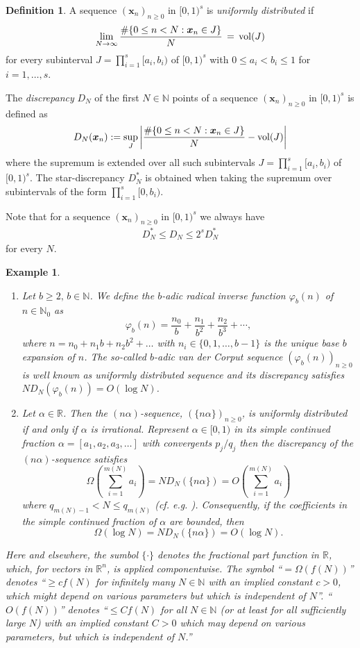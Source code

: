\documentclass{article}
\newcommand{\bsx}{\boldsymbol{x}}%
\newcommand{\NN}{\mathbb N}
\newcommand{\RR}{\mathbb R}
\newcommand{\vol}{{\rm vol}}
\renewcommand{\(}{\left (}
\renewcommand{\)}{\right )}
\newtheorem{example}[theorem]{Example}
\theoremstyle{definition}
\newtheorem{definition}[theorem]{Definition}
\numberwithin{equation}{section}
\begin{document}
\begin{definition}
	A sequence $(\bsx_n)_{n\geq 0}$ in $[0,1)^s$ is \emph{uniformly distributed} if 
	$$\lim_{N\to\infty}\frac{\#\{0\leq n<N: \bsx_n\in J\}}{N}\,=\,\vol(J)$$
	for every subinterval $J=\prod_{i=1}^s[a_i,b_i)$ of $[0,1)^s$ with $0\leq a_i<b_i\leq 1$ for $i=1,\ldots,s$. 

	The \emph{discrepancy} $D_N$ of the first $N\in\NN$ points of a sequence $(\bsx_n)_{n\geq 0}$ in $[0,1)^s$ is defined as  
	$$D_N(\bsx_n):=\sup_{J} \left|\frac{\#\{0\leq n<N: \bsx_n \in J\}}{N}-\vol(J)\right|$$
	where the supremum is extended over all such subintervals $J=\prod_{i=1}^s[a_i,b_i)$ of $[0,1)^s$. 
	The star-discrepancy $D^*_N$ is obtained when taking the supremum over subintervals of the form $\prod_{i=1}^s[0,b_i)$. 
\end{definition}
Note that for a sequence $(\bsx_n)_{n\geq 0}$ in $[0,1)^s$ we always have 
\begin{align}\label{eq:starvsnonstar}
D^*_N\leq D_N\leq 2^s D^*_N
\end{align}
 for every $N$. 
\begin{example}\label{ex:1}{\rm
	\begin{enumerate}
		\item Let $b\geq 2,\,b\in\NN$. We define the $b$-adic radical inverse function $\varphi_b(n)$ of $n\in\NN_0$ as $$\varphi_b(n)=\frac{n_0}{b}+\frac{n_1}{b^2}+\frac{n_2}{b^3}+\cdots,$$
		where $n=n_0+n_1b+n_2b^2+\ldots$ with $n_i\in\{0,1,\ldots,b-1\}$ is the unique base $b$ expansion of $n$. 
		The so-called $b$-adic van der Corput sequence $(\varphi_b(n))_{n\geq 0}$ is well known as {uniformly distributed} sequence and its {discrepancy} satisfies $ND_N(\varphi_b(n))=O(\log N)$. 
		\item Let $\alpha\in\RR$. Then the \emph{$(n\alpha)$-sequence}, $(\{n\alpha\})_{n\geq 0}$, is {uniformly distributed} if and only if $\alpha$ is irrational. 
		Represent $\alpha\in[0,1)$ in its simple continued fraction $\alpha=[a_1,a_2,a_3,\ldots]$ with convergents $p_j/q_j$ then the discrepancy of the \emph{$(n\alpha)$-sequence} satisfies 
		$$\Omega\left(\sum_{i=1}^{m(N)}a_i\right) =ND_N(\{n\alpha \})=O\left(\sum_{i=1}^{m(N)}a_i\right)$$ 
		where $q_{m(N)-1}<N\leq q_{m(N)}$ (cf. e.g. \cite[Corollary~1.64]{DT}). Consequently, if the coefficients in the simple continued fraction of $\alpha$ are bounded, then 
		\begin{equation}\label{eq:disc_nalpha}
		\Omega\left(\log N\right) =ND_N(\{n\alpha \})=O\left(\log N\right).
		\end{equation}
	\end{enumerate}
Here and elsewhere, the sumbol $\{\cdot\}$ denotes the fractional part function in $\RR$, which, for vectors in $\RR^n$, is applied componentwise. The symbol ``$=\Omega(f(N))$'' denotes ``$\geq c f(N)$ for infinitely many $N\in\NN$ with an implied constant $c>0$, which might depend on various parameters but which is independent of $N$''. ``$O(f(N))$'' denotes ``$\leq C f(N)$ for all $N\in\NN$ (or at least for all sufficiently large $N$) with an implied constant $C>0$ which may depend on various parameters, but which is independent of $N$.''} 
\end{example}
\end{document}

